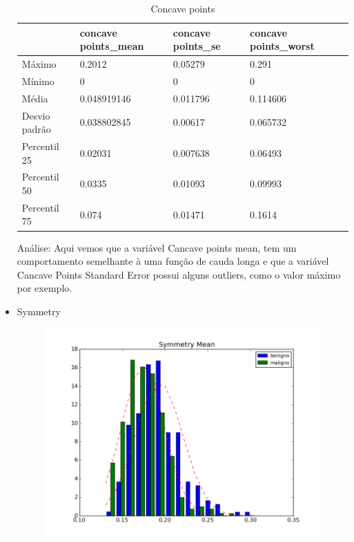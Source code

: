 \documentclass[11pt,a4paper]{article}
\numberwithin{equation}{section}
\begin{document}
\begin{itemize}
\begin{table}[H]
\centering
\caption{Concave points}
\label{my-label}
\begin{tabular}{lllll} \hline
              & concave points\_mean & concave points\_se & concave points\_worst &  \\ \hline
Máximo        & 0.2012               & 0.05279            & 0.291                 &  \\
Mínimo        & 0                    & 0                  & 0                     &  \\
Média         & 0.048919146          & 0.011796           & 0.114606              &  \\
Desvio padrão & 0.038802845          & 0.00617            & 0.065732              &  \\
Percentil 25  & 0.02031              & 0.007638           & 0.06493               &  \\
Percentil 50  & 0.0335               & 0.01093            & 0.09993               &  \\
Percentil 75  & 0.074                & 0.01471            & 0.1614                &  \\ \hline
\end{tabular}
\end{table}

Análise: Aqui vemos que a variável Cancave points mean, tem um comportamento semelhante  à uma função de cauda longa e que a variável Cancave Points Standard Error possui alguns outliers,  como o valor máximo por exemplo.

\item Symmetry
\begin{figure}[H]
\centering
  \includegraphics[width=.5\linewidth]{../img/hist/symmetry_mean}
  \label{fig:test1}
\end{figure}%


\end{itemize}
\end{document}
